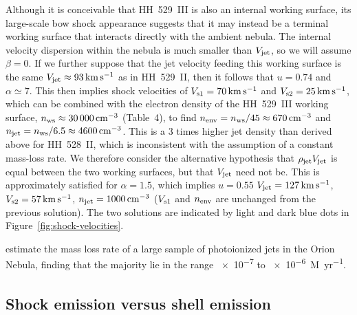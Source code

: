 \documentclass[useAMS, usenatbib]{mnras}
\begin{document}
Although it is conceivable that HH~529~III is also an internal working surface, its large-scale bow shock appearance suggests that it may instead be a terminal working surface that interacts directly with the ambient nebula.  The internal velocity dispersion within the nebula \citetext{\(\approx \SI{6}{km.s^{-1}}\), \citealp{Arthur:2016a}}
is much smaller than \(V_{\mathrm{jet}}\), so we will assume \(\beta = 0\).
If we further suppose that the jet velocity feeding this working surface is the same \(V_{\mathrm{jet}} \approx \SI{93}{km.s^{-1}}\)
as in HH~529~II, then it follows that \(u = 0.74\) and \(\alpha \simeq 7\).
This then implies shock velocities of \(V_{\text{s1}} = \SI{70}{km.s^{-1}}\)
and \(V_{\text{s2}} = \SI{25}{km.s^{-1}}\),
which can be combined with the electron density of the HH~529~III working surface, 
\(n_{\mathrm{ws}} \approx \SI{30000}{cm^{-3}}\) (Table~4),
to find \(n_{\mathrm{env}} = n_{\mathrm{ws}} / 45 \approx \SI{670}{cm^{-3}}\)
and \(n_{\mathrm{jet}} = n_{\mathrm{ws}} / 6.5 \approx \SI{4600}{cm^{-3}}\).
This is a 3 times higher jet density than derived above for HH~528~II,
which is inconsistent with the assumption of a constant mass-loss rate.
We therefore consider the alternative hypothesis that \(\rho_{\mathrm{jet}} V_{\mathrm{jet}}\)
is equal between the two working surfaces, but that \(V_{\mathrm{jet}}\) need not be.
This is approximately satisfied for \(\alpha = 1.5\), which implies \(u = 0.55\)
\(V_{\mathrm{jet}} = \SI{127}{km.s^{-1}}\), \(V_{\text{s2}} = \SI{57}{km.s^{-1}}\), \(n_{\mathrm{jet}} = \SI{1000}{cm^{-3}}\) (\(V_{\text{s1}}\) and \(n_{\mathrm{env}}\) are unchanged from the previous solution).
The two solutions are indicated by light and dark blue dots in Figure~\ref{fig:shock-velocities}. 




\citet{Bally:2006a} estimate the mass loss rate of a large sample of photoionized jets in the Orion Nebula, finding that the majority lie in the range \num{e-7} to \SI{e-6}{M_\odot.yr^{-1}}.  



\subsection{Shock emission versus shell emission}
\label{sec:shock-emiss-vers}




\end{document}

